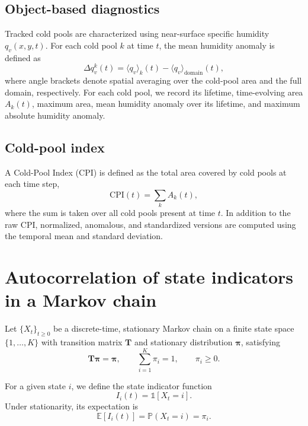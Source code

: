 \documentclass[11pt]{article}
\begin{document}
\subsection*{Object-based diagnostics}

Tracked cold pools are characterized using near-surface specific humidity $q_v(x,y,t)$. For each cold
pool $k$ at time $t$, the mean humidity anomaly is defined as
\begin{equation}
\Delta q_v^k(t) = \langle q_v \rangle_k(t) - \langle q_v \rangle_{\mathrm{domain}}(t),
\end{equation}
where angle brackets denote spatial averaging over the cold-pool area and the full domain,
respectively. For each cold pool, we record its lifetime, time-evolving area $A_k(t)$, maximum area,
mean humidity anomaly over its lifetime, and maximum absolute humidity anomaly.

\subsection*{Cold-pool index}

A Cold-Pool Index (CPI) is defined as the total area covered by cold pools at each time step,
\begin{equation}
\mathrm{CPI}(t) = \sum_k A_k(t),
\end{equation}
where the sum is taken over all cold pools present at time $t$. In addition to the raw CPI, normalized,
anomalous, and standardized versions are computed using the temporal mean and standard deviation.


\section{Autocorrelation of state indicators in a Markov chain}

Let $\{X_t\}_{t\ge 0}$ be a discrete-time, stationary Markov chain on a finite
state space $\{1,\dots,K\}$ with transition matrix $\mathbf{T}$ and stationary
distribution $\boldsymbol{\pi}$, satisfying
\begin{equation}
    \mathbf{T}\boldsymbol{\pi} = \boldsymbol{\pi},
    \qquad
    \sum_{i=1}^K \pi_i = 1,
    \qquad
    \pi_i \ge 0.
\end{equation}

For a given state $i$, we define the state indicator function
\begin{equation}
    I_i(t) = \mathbb{1}[X_t = i].
\end{equation}
Under stationarity, its expectation is
\begin{equation}
    \mathbb{E}[I_i(t)] = \mathbb{P}(X_t = i) = \pi_i.
\end{equation}
\end{document}
